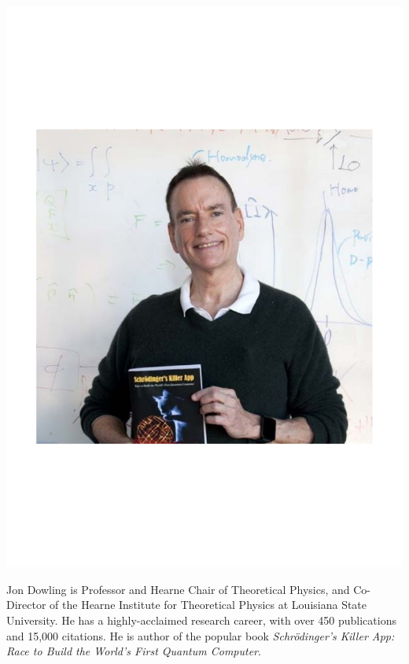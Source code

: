 \includegraphics[width=\columnwidth]{photo_jon_dowling}

Jon Dowling is Professor and Hearne Chair of Theoretical Physics, and Co-Director of the Hearne Institute for Theoretical Physics at Louisiana State University. He has a highly-acclaimed research career, with over 450 publications and 15,000 citations. He is author of the popular book \textit{Schr\"odinger's Killer App: Race to Build the World's First Quantum Computer}.



